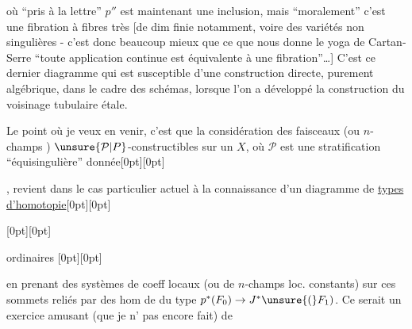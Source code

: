%
où ``pris à la lettre'' $p''$ est maintenant une inclusion, mais ``moralement'' c'est  une fibration à fibres très  [de dim finie notamment, voire des variétés non singulières - c'est donc beaucoup mieux que ce que nous donne le yoga de Cartan-Serre ``toute application continue est équivalente à une fibration''\ldots] C'est ce dernier diagramme qui est susceptible d'une construction directe, purement algébrique, dans le cadre des schémas, lorsque l'on a développé la construction du voisinage tubulaire étale.

Le point où je veux en venir, c'est que la considération  des faisceaux (ou  $n$-champs ) $\unsure{\mathcal P|P}$-constructibles sur un $X$, où $\mathcal P$ est une stratification ``équisingulière'' donnée\raisebox{0pt}[0pt][0pt]{\parbox{0pt}{}}, revient dans le cas particulier actuel à la connaissance d'un diagramme de \uline{types d'homotopie}\raisebox{0pt}[0pt][0pt]{\parbox{0pt}{}} \raisebox{0pt}[0pt][0pt]{\parbox{0pt}{}} ordinaires
\raisebox{0pt}[0pt][0pt]{\parbox{0pt}{}}en prenant des systèmes de coeff locaux (ou de $n$-champs loc. constants) sur ces sommets  reliés par des hom de  du type $p^*(F_0)\to J^*\unsure{(}F_1)$. Ce serait un exercice amusant (que je n' pas encore fait) de
